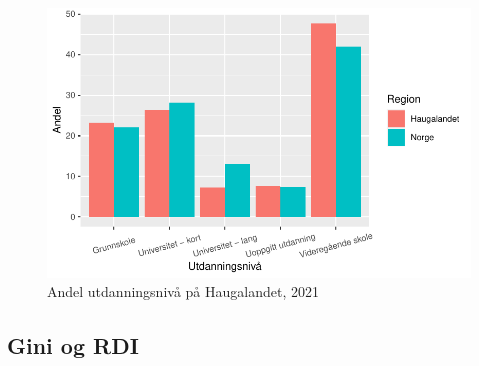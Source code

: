 \documentclass[
]{article}
\begin{document}
\begin{figure}[H]

{\centering \includegraphics{Masteroppgave_files/figure-pdf/fig-utdanning-1.pdf}

}

\caption{\label{fig-utdanning}Andel utdanningsnivå på Haugalandet, 2021}

\end{figure}

\hypertarget{gini-og-rdi}{%
\subsection{Gini og RDI}\label{gini-og-rdi}}
\end{document}
